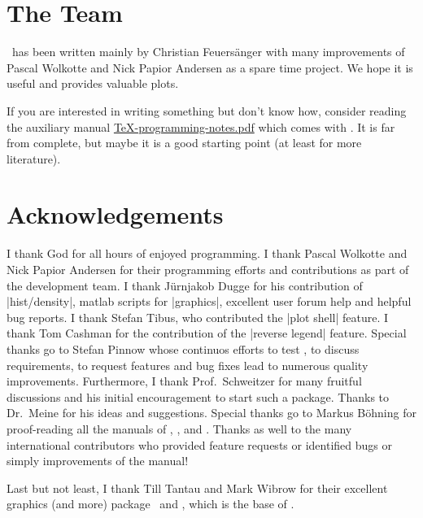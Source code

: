 \section{The Team}
\PGFPlots\ has been written mainly by Christian Feuersänger with many improvements of Pascal Wolkotte and Nick Papior Andersen as a spare time project. We hope it is useful and provides valuable plots.

If you are interested in writing something but don't know how, consider reading the auxiliary manual \href{file:TeX-programming-notes.pdf}{TeX-programming-notes.pdf} which comes with \PGFPlots. It is far from complete, but maybe it is a good starting point (at least for more literature).

\section{Acknowledgements}
I thank God for all hours of enjoyed programming. I thank Pascal Wolkotte and Nick Papior Andersen for their programming efforts and contributions as part of the development team. I thank J\"urnjakob Dugge for his contribution of |hist/density|, matlab scripts for  |graphics|, excellent user forum help and helpful bug reports. I thank Stefan Tibus, who contributed the |plot shell| feature. I thank Tom Cashman for the contribution of the |reverse legend| feature. Special thanks go to Stefan Pinnow whose continuos efforts to test \PGFPlots, to discuss requirements, to request features and bug fixes lead to numerous quality improvements. Furthermore, I thank Prof.~Schweitzer for many fruitful discussions and his initial encouragement to start such a package. Thanks to Dr.~Meine for his ideas and suggestions. Special thanks go to Markus B\"ohning for proof-reading all the manuals of \PGF, \PGFPlots, and \PGFPlotstable. Thanks as well to the many international contributors who provided feature requests or identified bugs or simply improvements of the manual!

Last but not least, I thank Till Tantau and Mark Wibrow for their excellent graphics (and more) package \PGF\ and \Tikz, which is the base of \PGFPlots.



